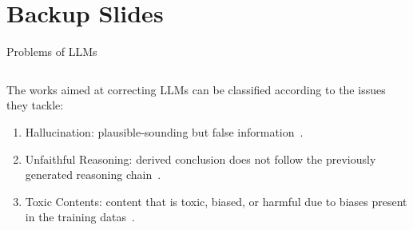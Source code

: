 \section{Backup Slides}

\begin{frame}{Problems of LLMs}
    \begin{columns}[T]
        \begin{column}{0.70\textwidth}
            The works aimed at correcting LLMs can be classified according to the issues they tackle:
            \begin{enumerate}
                \item Hallucination: plausible-sounding but false information~\cite{gao2023rarr, zhang2023language}.

                \item Unfaithful Reasoning: derived conclusion does not follow the previously generated reasoning chain~\cite{he2022rethinking, pan2023logiclm}.

                \item Toxic Contents: content that is toxic, biased, or harmful due to biases present in the training datas~\cite{lu2022quark, gou2023critic}.


\end{enumerate}
\end{column}
\end{columns}
\end{frame}
